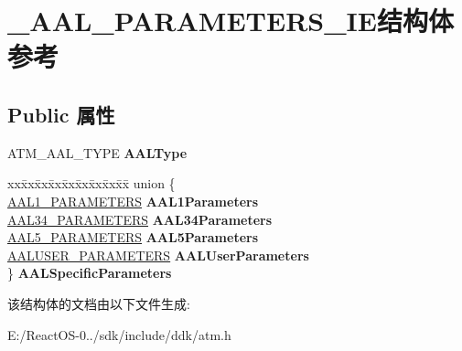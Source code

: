 \hypertarget{struct___a_a_l___p_a_r_a_m_e_t_e_r_s___i_e}{}\section{\+\_\+\+A\+A\+L\+\_\+\+P\+A\+R\+A\+M\+E\+T\+E\+R\+S\+\_\+\+I\+E结构体 参考}
\label{struct___a_a_l___p_a_r_a_m_e_t_e_r_s___i_e}
\subsection*{Public 属性}
\begin{DoxyCompactItemize}
\item 
\mbox{\label{struct___a_a_l___p_a_r_a_m_e_t_e_r_s___i_e_a82f701f1192512542563cb310d63e244}} 
A\+T\+M\+\_\+\+A\+A\+L\+\_\+\+T\+Y\+PE {\bfseries A\+A\+L\+Type}
\item 
\mbox{\label{struct___a_a_l___p_a_r_a_m_e_t_e_r_s___i_e_a2a1f408b1b2e14f1dc9e7017a1390e2d}} 
\begin{tabbing}
xx\=xx\=xx\=xx\=xx\=xx\=xx\=xx\=xx\=\kill
union \{\\
\>\hyperlink{struct___a_a_l1___p_a_r_a_m_e_t_e_r_s}{AAL1\_PARAMETERS} {\bfseries AAL1Parameters}\\
\>\hyperlink{struct___a_a_l34___p_a_r_a_m_e_t_e_r_s}{AAL34\_PARAMETERS} {\bfseries AAL34Parameters}\\
\>\hyperlink{struct_a_a_l5___p_a_r_a_m_e_t_e_r_s}{AAL5\_PARAMETERS} {\bfseries AAL5Parameters}\\
\>\hyperlink{struct_a_a_l_u_s_e_r___p_a_r_a_m_e_t_e_r_s}{AALUSER\_PARAMETERS} {\bfseries AALUserParameters}\\
\} {\bfseries AALSpecificParameters}\\

\end{tabbing}\end{DoxyCompactItemize}


该结构体的文档由以下文件生成\+:\begin{DoxyCompactItemize}
\item 
E\+:/\+React\+O\+S-\/0../sdk/include/ddk/atm.\+h\end{DoxyCompactItemize}
